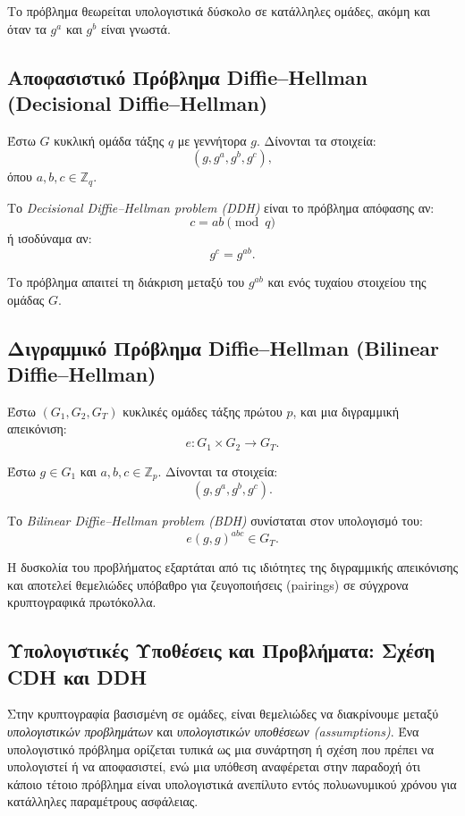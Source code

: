 \documentclass[12pt,a4paper]{report}
\begin{document}
Το πρόβλημα θεωρείται υπολογιστικά δύσκολο σε κατάλληλες ομάδες, ακόμη και όταν τα $g^a$ και $g^b$ είναι γνωστά.

\subsection{Αποφασιστικό Πρόβλημα Diffie--Hellman (Decisional Diffie--Hellman)}

Έστω $G$ κυκλική ομάδα τάξης $q$ με γεννήτορα $g$. Δίνονται τα στοιχεία:
\[
(g, g^a, g^b, g^c),
\]
όπου $a,b,c \in \mathbb{Z}_q$.

Το \textit{Decisional Diffie--Hellman problem (DDH)} είναι το πρόβλημα απόφασης αν:
\[
c = ab \pmod{q}
\]
ή ισοδύναμα αν:
\[
g^c = g^{ab}.
\]

Το πρόβλημα απαιτεί τη διάκριση μεταξύ του $g^{ab}$ και ενός τυχαίου στοιχείου της ομάδας $G$.

\subsection{Διγραμμικό Πρόβλημα Diffie--Hellman (Bilinear Diffie--Hellman)}

Έστω $(G_1, G_2, G_T)$ κυκλικές ομάδες τάξης πρώτου $p$, και μια διγραμμική απεικόνιση:
\[
e: G_1 \times G_2 \to G_T.
\]

Έστω $g \in G_1$ και $a,b,c \in \mathbb{Z}_p$. Δίνονται τα στοιχεία:
\[
(g, g^a, g^b, g^c).
\]

Το \textit{Bilinear Diffie--Hellman problem (BDH)} συνίσταται στον υπολογισμό του:
\[
e(g,g)^{abc} \in G_T.
\]

Η δυσκολία του προβλήματος εξαρτάται από τις ιδιότητες της διγραμμικής απεικόνισης και αποτελεί θεμελιώδες υπόβαθρο για ζευγοποιήσεις (pairings) σε σύγχρονα κρυπτογραφικά πρωτόκολλα.


\subsection{Υπολογιστικές Υποθέσεις και Προβλήματα: Σχέση CDH και DDH}

Στην κρυπτογραφία βασισμένη σε ομάδες, είναι θεμελιώδες να διακρίνουμε μεταξύ \textit{υπολογιστικών προβλημάτων} και \textit{υπολογιστικών υποθέσεων (assumptions)}. Ένα υπολογιστικό πρόβλημα ορίζεται τυπικά ως μια συνάρτηση ή σχέση που πρέπει να υπολογιστεί ή να αποφασιστεί, ενώ μια υπόθεση αναφέρεται στην παραδοχή ότι κάποιο τέτοιο πρόβλημα είναι υπολογιστικά ανεπίλυτο εντός πολυωνυμικού χρόνου για κατάλληλες παραμέτρους ασφάλειας.
\end{document}
